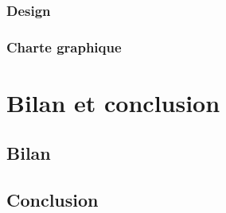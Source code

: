 \documentclass[french]{report}
\begin{document}
\subsection{Design}
\label{partie_design}

\subsection{Charte graphique}
\label{partie_charte_graphique}



\chapter{Bilan et conclusion}
\section{Bilan}
\label{partie_bilan}

\section{Conclusion}
\label{partie_conclusion}



\appendix 

\end{document}
